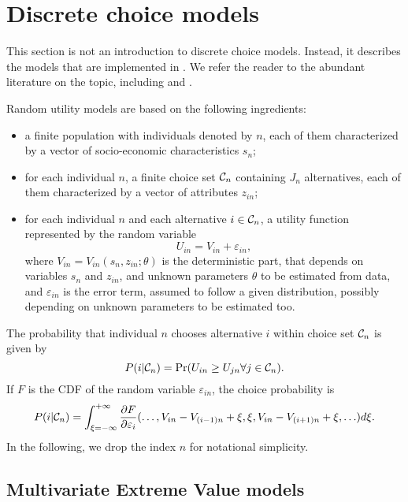 \documentclass[12pt]{memoir}
\begin{document}
\section{Discrete choice models}
\label{sec:models}

   This section is not an introduction to discrete choice
   models. Instead, it describes the models that are implemented in
   \BIOGEME. We refer the reader to the abundant literature on the topic,
   including    and .

  Random utility models are based on the following ingredients:
  \begin{itemize}
  \item a finite population with individuals denoted by $n$, each of them characterized by a vector of socio-economic characteristics $s_n$;
  \item for each individual $n$, a finite choice set $\mathcal{C}_n$ containing $J_n$ alternatives, each of them characterized by a vector of attributes $z_{in}$;
  \item for each individual $n$ and each alternative $i \in \mathcal{C}_n$, a utility function represented by the random variable
\begin{equation}
U_{in} = V_{in} + \varepsilon_{in},
\end{equation}
where $V_{in} = V_{in}(s_n,z_{in};\theta)$ is the deterministic part,
that depends on variables $s_n$ and $z_{in}$, and unknown parameters
$\theta$ to be estimated from data, and $\varepsilon_{in}$ is the
error term, assumed to follow a given distribution, possibly depending
on unknown parameters to be estimated too.
  \end{itemize}

The probability that individual $n$ chooses alternative $i$ within
choice set $\mathcal{C}_n$ is given by
\begin{equation}
P(i|\mathcal{C}_n) =\operatorname{Pr}(U_{in} \geq U_{jn} \forall j \in \mathcal{C}_n).
\end{equation}
If $F$ is the CDF of the random variable $\varepsilon_{in}$, the
choice probability is 
\begin{equation}
P(i|\mathcal{C}_n) =\int_{\xi=-\infty}^{+\infty} \frac{\partial F}{\partial \varepsilon_{i}}(\ldots,V_{in}-V_{(i-1)n}+\xi,\xi,V_{in}-V_{(i+1)n}+\xi,\ldots)d\xi.
\end{equation}
In the following, we drop the index $n$ for notational simplicity. 

\subsection{Multivariate Extreme Value models}
\end{document}

